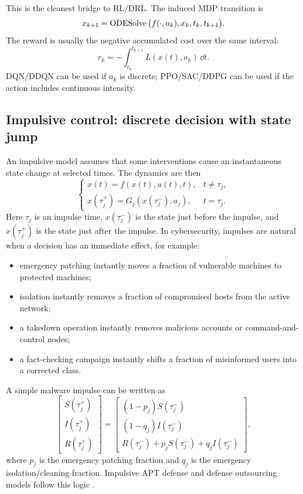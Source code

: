 \documentclass[11pt,a4paper]{article}
\begin{document}
This is the cleanest bridge to RL/DRL. The induced MDP transition is
\begin{equation}
    x_{k+1}=\operatorname{ODESolve}\big(f(\cdot,a_k),x_k,t_k,t_{k+1}\big).
\end{equation}
The reward is usually the negative accumulated cost over the same interval:
\begin{equation}
    r_k=-\int_{t_k}^{t_{k+1}} L(x(t),a_k)\,\dd t.
\end{equation}
DQN/DDQN can be used if $a_k$ is discrete; PPO/SAC/DDPG can be used if the action includes continuous intensity.

\subsection{Impulsive control: discrete decision with state jump}
An impulsive model assumes that some interventions cause an instantaneous state change at selected times. The dynamics are then
\begin{equation}
\begin{cases}
\dot{x}(t)=f(x(t),u(t),t), & t\neq \tau_j,\\[0.2em]
x(\tau_j^+)=G_j(x(\tau_j^-),a_j), & t=\tau_j.
\end{cases}
\end{equation}
Here $\tau_j$ is an impulse time, $x(\tau_j^-)$ is the state just before the impulse, and $x(\tau_j^+)$ is the state just after the impulse. In cybersecurity, impulses are natural when a decision has an immediate effect, for example:
\begin{itemize}
\item emergency patching instantly moves a fraction of vulnerable machines to protected machines;
\item isolation instantly removes a fraction of compromised hosts from the active network;
\item a takedown operation instantly removes malicious accounts or command-and-control nodes;
\item a fact-checking campaign instantly shifts a fraction of misinformed users into a corrected class.
\end{itemize}
A simple malware impulse can be written as
\begin{equation}
\begin{bmatrix}S(\tau_j^+)\\ I(\tau_j^+)\\ R(\tau_j^+)\end{bmatrix}
=
\begin{bmatrix}
(1-p_j)S(\tau_j^-)\\
(1-q_j)I(\tau_j^-)\\
R(\tau_j^-)+p_jS(\tau_j^-)+q_jI(\tau_j^-)
\end{bmatrix},
\end{equation}
where $p_j$ is the emergency patching fraction and $q_j$ is the emergency isolation/cleaning fraction. Impulsive APT defense and defense outsourcing models follow this logic \cite{sun2023impulsive,qin2024impulsive}.
\end{document}
